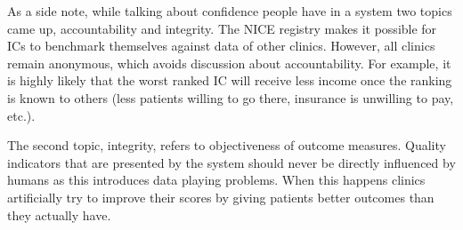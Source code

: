 As a side note, while talking about confidence people have in a system two topics came up, accountability and integrity.
The NICE registry makes it possible for ICs to benchmark themselves against data of other clinics.
However, all clinics remain anonymous, which avoids discussion about accountability. 
For example, it is highly likely that the worst ranked IC will receive less income once the ranking is known to others (less patients willing to go there, insurance is unwilling to pay, etc.).

The second topic, integrity, refers to objectiveness of outcome measures.
Quality indicators that are presented by the system should never be directly influenced by humans as this introduces data playing problems. 
When this happens clinics artificially try to improve their scores by giving patients better outcomes than they actually have.